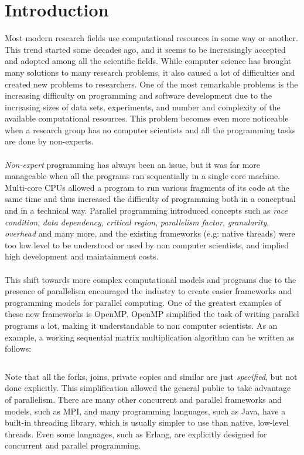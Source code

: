 \section{Introduction}
\label{sec:introduction}
Most modern research fields use computational resources in some way or another. This trend started some decades ago, and it seems to be increasingly accepted and adopted among all the scientific fields. While computer science has brought many solutions to many research problems, it also caused a lot of difficulties and created new problems to researchers. One of the most remarkable problems is the increasing difficulty on programming and software development due to the increasing sizes of data sets, experiments, and number and complexity of the available computational resources. This problem becomes even more noticeable when a research group has no computer scientists and all the programming tasks are done by non-experts.\\
\\
\textit{Non-expert} programming has always been an issue, but it was far more manageable when all the programs ran sequentially in a single core machine. Multi-core CPUs allowed a program to run various fragments of its code at the same time and thus increased the difficulty of programming both in a conceptual and in a technical way. Parallel programming introduced concepts such as \textit{race condition}, \textit{data dependency}, \textit{critical region}, \textit{parallelism factor}, \textit{granularity}, \textit{overhead} and many more, and the existing frameworks (e.g: native threads) were too low level to be understood or used by non computer scientists, and implied high development and maintainment costs.\\
\\
This shift towards more complex computational models and programs due to the presence of parallelism encouraged the industry to create easier frameworks and programming models for parallel computing. One of the greatest examples of these new frameworks is OpenMP\cite{openmp08}. OpenMP simplified the task of writing parallel programs a lot, making it understandable to non computer scientists. As an example, a working sequential matrix multiplication algorithm can be written as follows:
\inputminted{c}{snippets/matmul_openmp.cc}
Note that all the forks, joins, private copies and similar are just \textit{specified}, but not done explicitly. This simplification allowed the general public to take advantage of parallelism. There are many other concurrent and parallel frameworks and models, such as MPI\cite{Forum:1994:MMI:898758}, and many programming languages, such as Java, have a built-in threading library, which is usually simpler to use than native, low-level threads. Even some languages, such as Erlang, are explicitly designed for concurrent and parallel programming.\\
